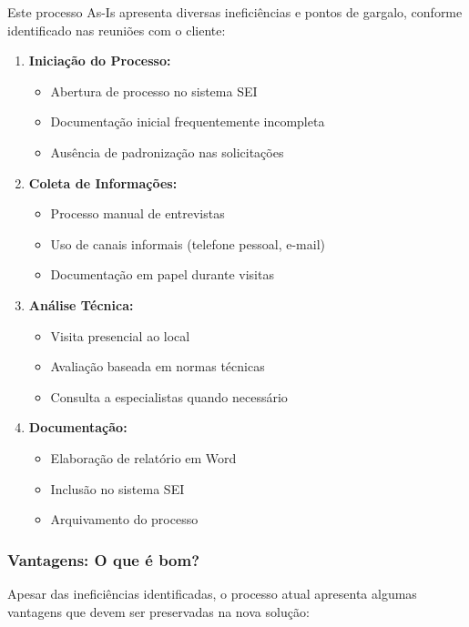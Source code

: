 \documentclass[12pt,a4paper]{article}
\begin{document}
Este processo As-Is apresenta diversas ineficiências e pontos de gargalo, conforme identificado nas reuniões com o cliente:

\begin{enumerate}
    \item \textbf{Iniciação do Processo:}
    \begin{itemize}
        \item Abertura de processo no sistema SEI
        \item Documentação inicial frequentemente incompleta
        \item Ausência de padronização nas solicitações
    \end{itemize}
    
    \item \textbf{Coleta de Informações:}
    \begin{itemize}
        \item Processo manual de entrevistas
        \item Uso de canais informais (telefone pessoal, e-mail)
        \item Documentação em papel durante visitas
    \end{itemize}
    
    \item \textbf{Análise Técnica:}
    \begin{itemize}
        \item Visita presencial ao local
        \item Avaliação baseada em normas técnicas
        \item Consulta a especialistas quando necessário
    \end{itemize}
    
    \item \textbf{Documentação:}
    \begin{itemize}
        \item Elaboração de relatório em Word
        \item Inclusão no sistema SEI
        \item Arquivamento do processo
    \end{itemize}
\end{enumerate}

\subsubsection{Vantagens: O que é bom?}
Apesar das ineficiências identificadas, o processo atual apresenta algumas vantagens que devem ser preservadas na nova solução:
\end{document}
